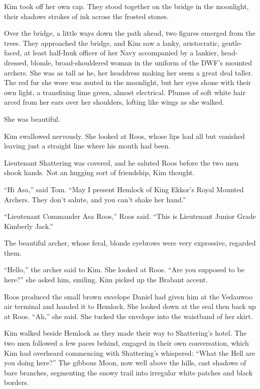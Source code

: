 \documentclass[11pt,a5paper]{article}
\begin{document}
Kim took off her own cap. They stood together on the bridge in the moonlight, their shadows strokes of ink across the frosted stones.

Over the bridge, a little ways down the path ahead, two figures emerged from the trees. They approached the bridge, and Kim saw a lanky, aristocratic, gentle-faced, at least half-Inuk officer of her Navy accompanied by a lankier, head-dressed, blonde, broad-shouldered woman in the uniform of the DWF's mounted archers. She was as tall as he, her headdress making her seem a great deal taller. The red fur she wore was muted in the moonlight, but her eyes shone with their own light, a transfixing lime green, almost electrical. Plumes of soft white hair arced from her ears over her shoulders, lofting like wings as she walked.

She was beautiful.

Kim swallowed nervously. She looked at Roos, whose lips had all but vanished leaving just a straight line where his mouth had been.

Lieutenant Shattering was covered, and he saluted Roos before the two men shook hands. Not an hugging sort of friendship, Kim thought.

``Hi Asa,'' said Tom. ``May I present Hemlock of King Ekkor's Royal Mounted Archers. They don't salute, and you can't shake her hand.''

``Lieutenant Commander Asa Roos,'' Roos said. ``This is Lieutenant Junior Grade Kimberly Jack.''

The beautiful archer, whose feral, blonde eyebrows were very expressive, regarded them.

``Hello,'' the archer said to Kim. She looked at Roos. ``Are you supposed to be here?'' she asked him, smiling. Kim picked up the Brabant accent.

Roos produced the small brown envelope Daniel had given him at the Vedauwoo air terminal and handed it to Hemlock. She looked down at the seal then back up at Roos. ``Ah,'' she said. She tucked the envelope into the waistband of her skirt.

\vspace{1em}

Kim walked beside Hemlock as they made their way to Shattering's hotel. The two men followed a few paces behind, engaged in their own conversation, which Kim had overheard commencing with Shattering's whispered: ``What the Hell are you doing here?'' The gibbous Moon, now well above the hills, cast shadows of bare branches, segmenting the snowy trail into irregular white patches and black borders.
\end{document}
